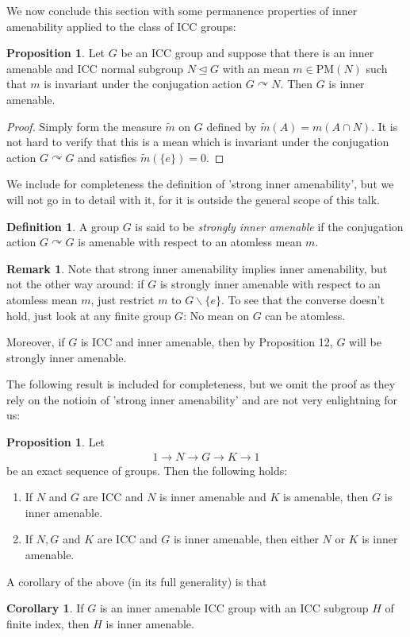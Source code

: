 \documentclass[10pt,oneside,openany,final]{memoir}
\theoremstyle{definition}
\newtheorem{proposition}[theorem]{Proposition}
\newtheorem{corollary}[theorem]{Corollary}
\newtheorem{definition}[theorem]{Definition}
\theoremstyle{Break}
\newtheorem*{remark}{Remark}
\newcommand{\PM}{\mathrm{PM}}
\def\acts{\curvearrowright}
\begin{document}
We now conclude this section with some permanence properties of inner amenability applied to the class of ICC groups:

\begin{proposition}
	Let $G$ be an ICC group and suppose that there is an inner amenable and ICC normal subgroup $N \unlhd G$ with an mean $m \in \PM(N)$ such that $m$ is invariant under the conjugation action $G \acts N$. Then $G$ is inner amenable.
\end{proposition}
\begin{proof}
	Simply form the measure $\tilde{m}$ on $G$ defined by $\tilde{m}(A)=m(A \cap N)$. It is not hard to verify that this is a mean which is invariant under the conjugation action $G \acts G$ and satisfies $\tilde{m}(\{e\})=0$.
\end{proof}

We include for completeness the definition of 'strong inner amenability', but we will not go in to detail with it, for it is outside the general scope of this talk.
\begin{definition}
	A group $G$ is said to be \emph{strongly inner amenable} if the conjugation action $G \acts G$ is amenable with respect to an atomless mean $m$. 
\end{definition}
\begin{remark}
	Note that strong inner amenability implies inner amenability, but not the other way around: if $G$ is strongly inner amenable with respect to an atomless mean $m$, just restrict $m$ to $G\backslash\{e\}$. To see that the converse doesn't hold, just look at any finite group $G$: No mean on $G$ can be atomless.

	Moreover, if $G$ is ICC and inner amenable, then by Proposition 12, $G$ will be strongly inner amenable.
\end{remark}
The following result is included for completeness, but we omit the proof as they rely on the notioin of 'strong inner amenability' and are not very enlightning for us:
\begin{proposition}
	Let 
	\begin{align*}
		1 \to N \to G \to K \to 1
	\end{align*}
	be an exact sequence of groups. Then the following holds:
	\begin{enumerate}
		\item If $N$ and $G$ are ICC and $N$ is inner amenable and $K$ is amenable, then $G$ is inner amenable.
		\item If $N,G$ and $K$ are ICC and $G$ is inner amenable, then either $N$ or $K$ is inner amenable.
	\end{enumerate}
\end{proposition}
A corollary of the above (in its full generality) is that
\begin{corollary}
	If $G$ is an inner amenable ICC group with an ICC subgroup $H$ of finite index, then $H$ is inner amenable.
\end{corollary}
\end{document}

